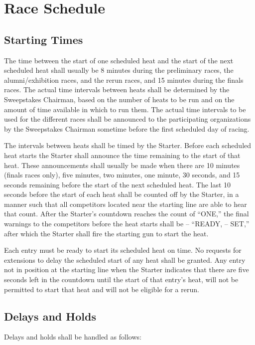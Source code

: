 \section{Race Schedule}

\subsection{Starting Times}

The time between the start of one scheduled heat and the start of the next scheduled heat shall usually be 8 minutes during the preliminary races, the alumni/exhibition races, and the rerun races, and 15 minutes during the finals races. The actual time intervals between heats shall be determined by the Sweepstakes Chairman, based on the number of heats to be run and on the amount of time available in which to run them. The actual time intervals to be used for the different races shall be announced to the participating organizations by the Sweepstakes Chairman sometime before the first scheduled day of racing.

The intervals between heats shall be timed by the Starter. Before each scheduled heat starts the Starter shall announce the time remaining to the start of that heat. These announcements shall usually be made when there are 10 minutes (finals races only), five minutes, two minutes, one minute, 30 seconds, and 15 seconds remaining before the start of the next scheduled heat. The last 10 seconds before the start of each heat shall be counted off by the Starter, in a manner such that all competitors located near the starting line are able to hear that count. After the Starter's countdown reaches the count of ``ONE,'' the final warnings to the competitors before the heat starts shall be -- ``READY, -- SET,'' after which the Starter shall fire the starting gun to start the heat.

Each entry must be ready to start its scheduled heat on time. No requests for extensions to delay the scheduled start of any heat shall be granted. Any entry not in position at the starting line when the Starter indicates that there are five seconds left in the countdown until the start of that entry's heat, will not be permitted to start that heat and will not be eligible for a rerun.

\subsection{Delays and Holds}

Delays and holds shall be handled as follows:

